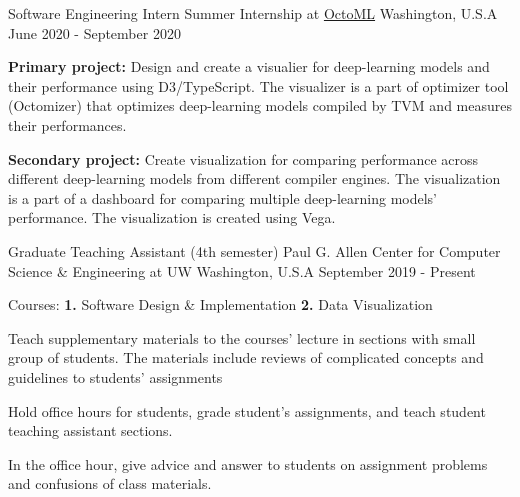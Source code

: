 

\begin{cventries}

  \cventry
    {Software Engineering Intern} %
    {Summer Internship at \href{https://octoml.ai/}{OctoML}} %
    {Washington, U.S.A} %
    {June 2020 - September 2020} %
    {
      \begin{cvitems} %
        \item {
          \textbf{Primary project:} Design and create a visualier for deep-learning models and their performance using D3/TypeScript.
          The visualizer is a part of optimizer tool (Octomizer) that optimizes deep-learning models compiled by TVM and measures their performances.
        }
        \item {
          \textbf{Secondary project:} Create visualization for comparing performance across different deep-learning models from different compiler engines.
          The visualization is a part of a dashboard for comparing multiple deep-learning models' performance.
          The visualization is created using Vega.
        }
      \end{cvitems}
    }

  \cventry
    {Graduate Teaching Assistant (4th semester)} %
    {Paul G. Allen Center for Computer Science \& Engineering at UW} %
    {Washington, U.S.A} %
    {September 2019 - Present} %
    {
      \begin{cvitems} %
        \item {
          Courses: \textbf{1.} Software Design \& Implementation \textbf{2.} Data Visualization
        }
        \item {
          Teach supplementary materials to the courses' lecture in sections with small group of students.
          The materials include reviews of complicated concepts and guidelines to students' assignments
        }
        \item {
          Hold office hours for students, grade student's assignments, and teach student teaching assistant sections.
        }
        \item {
          In the office hour, give advice and answer to students on assignment problems and confusions of class materials.
        }
      \end{cvitems}
    }


\end{cventries}
